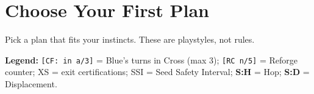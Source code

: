 \documentclass[11pt]{article}
\newcommand{\code}[1]{\texttt{#1}}
\newcommand{\code}[1]{\texttt{#1}}
\begin{document}
\clearpage

\section{Choose Your First Plan}
Pick a plan that fits your instincts. These are playstyles, not rules.



\noindent\textbf{Legend:}
\code{[CF: in a/3]} = Blue’s turns in Cross (max 3); 
\code{[RC n/5]} = Reforge counter; 
XS = exit certifications; 
SSI = Seed Safety Interval; 
\textbf{S:H} = Hop; \textbf{S:D} = Displacement.

\end{document}
